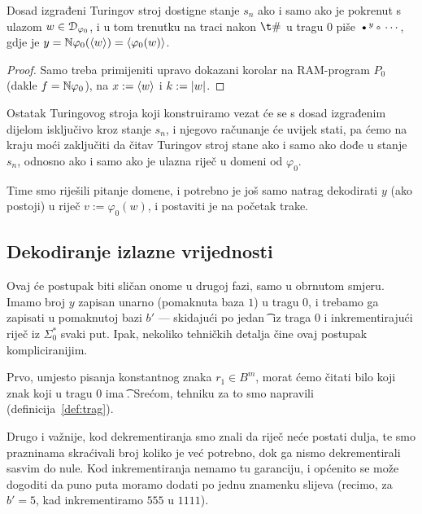 \begin{korolar}[{name=[prve tri faze transpiliranog stroja]}]\label{kor:faza3}
Dosad izgrađeni Turingov stroj dostigne stanje $s_n$ ako i samo ako je pokrenut s ulazom $w\in\mathcal D_{\varphi_0}$, i u tom trenutku na traci nakon $\t\#$ u tragu $0$ piše $\textup\textbullet^y\textup\textopenbullet\dotsm$, gdje je $y={\mathbb N}\varphi_0(\langle w\rangle)=\langle\varphi_0(w)\rangle$.
\end{korolar}
\begin{proof}
Samo treba primijeniti upravo dokazani korolar na RAM-program $P_0$ (dakle $f={\mathbb N}\varphi_0$), na $x:=\langle w\rangle$ i $k:=\lvert w\rvert$. %
\end{proof}

\begin{napomena}[{name=[zaustavljanje transpiliranog stroja ovisi samo o trećoj fazi]}]\label{nap:snstane}
Ostatak Turingovog stroja koji konstruiramo vezat će se s dosad izgrađenim dijelom isključivo kroz stanje $s_n$, i njegovo računanje će uvijek stati, pa ćemo na kraju moći zaključiti da čitav Turingov stroj stane ako i samo ako dođe u stanje $s_n$, odnosno ako i samo ako je ulazna riječ u domeni od $\varphi_0$.
\end{napomena}

Time smo riješili pitanje domene, i potrebno je još samo natrag dekodirati $y$ (ako postoji) u riječ $v:=\varphi_0(w)$, i postaviti je na početak trake.

\subsection{Dekodiranje izlazne vrijednosti}

Ovaj će postupak biti sličan onome u drugoj fazi, samo u obrnutom smjeru. Imamo broj $y$ zapisan unarno (pomaknuta baza $1$) u tragu $0$, i trebamo ga zapisati u pomaknutoj bazi $b'$ --- skidajući po jedan \t\textbullet\ iz traga $0$ i inkrementirajući riječ iz $\Sigma_0^*$ svaki put. Ipak, nekoliko tehničkih detalja čine ovaj postupak kompliciranijim.

Prvo, umjesto pisanja konstantnog znaka $r_1\in B^m$, morat ćemo čitati bilo koji znak koji u tragu $0$ ima \t\textbullet. Srećom, tehniku za to smo napravili (definicija~\ref{def:trag}).

Drugo i važnije, kod dekrementiranja smo znali da riječ neće postati dulja, te smo prazninama skraćivali broj koliko je već potrebno, dok ga nismo dekrementirali sasvim do nule. Kod inkrementiranja nemamo tu garanciju, i općenito se može dogoditi da puno puta moramo dodati po jednu znamenku slijeva (recimo, za $b'=5$, kad inkrementiramo $555$ u $1111$).

